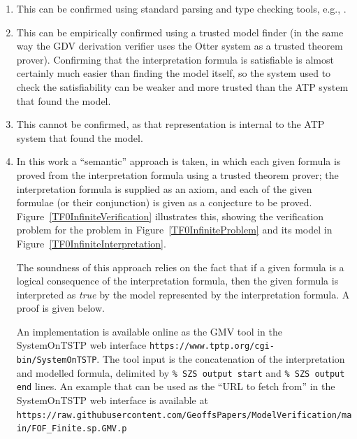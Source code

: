 \documentclass[letterpaper]{article}
\newcommand{\smalltt}[1]{\small \texttt{#1}}
\begin{document}
\begin{enumerate}
\item This can be confirmed using standard parsing and type checking tools, e.g., \cite{VS06,HR15}.
\item This can be empirically confirmed using a trusted model finder (in the same way the GDV 
      derivation verifier \cite{Sut06} uses the Otter system \cite{McC03-Otter} as a trusted 
      theorem prover).
      Confirming that the \small{interpretation} formula is satisfiable is almost certainly much 
      easier than finding the model itself, so the system used to check the satisfiability can 
      be weaker and more trusted than the ATP system that found the model.
\item This cannot be confirmed, as that representation is internal to the ATP system that found
      the model.
\item In this work a ``semantic'' approach is taken, in which each given formula is proved from
      the interpretation formula using a trusted theorem prover; the interpretation formula is 
      supplied as an axiom, and each of the given formulae (or their conjunction) is given as a 
      conjecture to be proved.
      Figure~\ref{TF0InfiniteVerification} illustrates this, showing the verification 
      problem for the problem in Figure~\ref{TF0InfiniteProblem} and its model in 
      Figure~\ref{TF0InfiniteInterpretation}.

      The soundness of this approach relies on the fact that if a given formula is a logical 
      consequence of the interpretation formula, then the given formula is interpreted as 
      {\em true} by the model represented by the interpretation formula.
      A proof is given below.

      An implementation is available online as the GMV tool in the SystemOnTSTP \cite{Sut07-CSR} 
      web interface \smalltt{https://www.tptp.org/cgi-bin/SystemOnTSTP}.
      The tool input is the concatenation of the interpretation and modelled formula,
      delimited by \smalltt{\% SZS output start} and \smalltt{\% SZS output end} lines.
      An example that can be used as the ``URL to fetch from'' in the SystemOnTSTP web 
      interface is available at
      {\scriptsize {\tt https://raw.githubusercontent.com/\allowbreak GeoffsPapers/\allowbreak ModelVerification/\allowbreak main/FOF\_Finite.sp.GMV.p}}

\end{enumerate}
\end{document}

